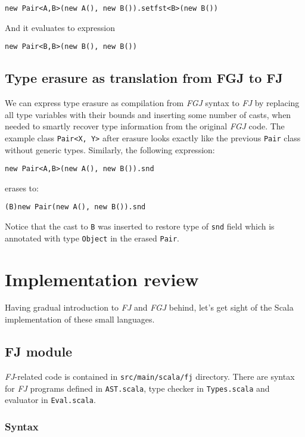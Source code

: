 \documentclass{article}[12pt]
\begin{document}
\begin{verbatim}
new Pair<A,B>(new A(), new B()).setfst<B>(new B())
\end{verbatim}
And it evaluates to expression
\begin{verbatim}
new Pair<B,B>(new B(), new B())
\end{verbatim}

\subsection{Type erasure as translation from FGJ to FJ}

We can express type erasure as compilation from \emph{FGJ} syntax
to \emph{FJ} by replacing all type variables with their bounds
and inserting some number of casts, when needed to smartly recover
type information from the original \emph{FGJ} code. The example class
\texttt{Pair<X, Y>} after erasure looks exactly like the previous
\texttt{Pair} class without generic types. Similarly, the following
expression:
\begin{verbatim}
new Pair<A,B>(new A(), new B()).snd
\end{verbatim}
erases to:
\begin{verbatim}
(B)new Pair(new A(), new B()).snd
\end{verbatim}
Notice that the cast to \texttt{B} was inserted to restore type
of \texttt{snd} field which is annotated with type \texttt{Object}
in the erased \texttt{Pair}.

\section{Implementation review}

Having gradual introduction to \emph{FJ} and \emph{FGJ} behind,
let's get sight of the Scala implementation of these small languages.

\subsection{FJ module}

\emph{FJ}-related code is contained in \texttt{src/main/scala/fj}
directory. There are syntax for \emph{FJ} programs defined in
\texttt{AST.scala}, type checker in \texttt{Types.scala} and
evaluator in \texttt{Eval.scala}.

\subsubsection{Syntax}
\end{document}
